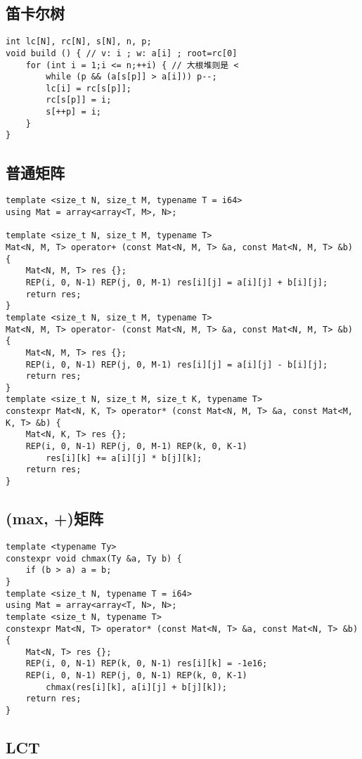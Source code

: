 \documentclass[a4paper,landscape,twocolumn]{ctexart}
\begin{document}
\subsection{笛卡尔树}

\begin{lstlisting}
int lc[N], rc[N], s[N], n, p;
void build () { // v: i ; w: a[i] ; root=rc[0]
	for (int i = 1;i <= n;++i) { // 大根堆则是 <
		while (p && (a[s[p]] > a[i])) p--;
		lc[i] = rc[s[p]];
		rc[s[p]] = i;
		s[++p] = i;
	}
}
\end{lstlisting}

\subsection{普通矩阵}

\begin{lstlisting}
template <size_t N, size_t M, typename T = i64>
using Mat = array<array<T, M>, N>;

template <size_t N, size_t M, typename T>
Mat<N, M, T> operator+ (const Mat<N, M, T> &a, const Mat<N, M, T> &b) {
	Mat<N, M, T> res {};
	REP(i, 0, N-1) REP(j, 0, M-1) res[i][j] = a[i][j] + b[i][j];
	return res;
}
template <size_t N, size_t M, typename T>
Mat<N, M, T> operator- (const Mat<N, M, T> &a, const Mat<N, M, T> &b) {
	Mat<N, M, T> res {};
	REP(i, 0, N-1) REP(j, 0, M-1) res[i][j] = a[i][j] - b[i][j];
	return res;
}
template <size_t N, size_t M, size_t K, typename T>
constexpr Mat<N, K, T> operator* (const Mat<N, M, T> &a, const Mat<M, K, T> &b) {
	Mat<N, K, T> res {};
	REP(i, 0, N-1) REP(j, 0, M-1) REP(k, 0, K-1)
		res[i][k] += a[i][j] * b[j][k];
	return res;
}
\end{lstlisting}

\subsection{(max, +)矩阵}

\begin{lstlisting}
template <typename Ty>
constexpr void chmax(Ty &a, Ty b) {
	if (b > a) a = b;
}
template <size_t N, typename T = i64>
using Mat = array<array<T, N>, N>;
template <size_t N, typename T>
constexpr Mat<N, T> operator* (const Mat<N, T> &a, const Mat<N, T> &b) {
	Mat<N, T> res {};
	REP(i, 0, N-1) REP(k, 0, N-1) res[i][k] = -1e16;
	REP(i, 0, N-1) REP(j, 0, N-1) REP(k, 0, K-1)
		chmax(res[i][k], a[i][j] + b[j][k]);
	return res;
}
\end{lstlisting}

\subsection{LCT}
\end{document}
